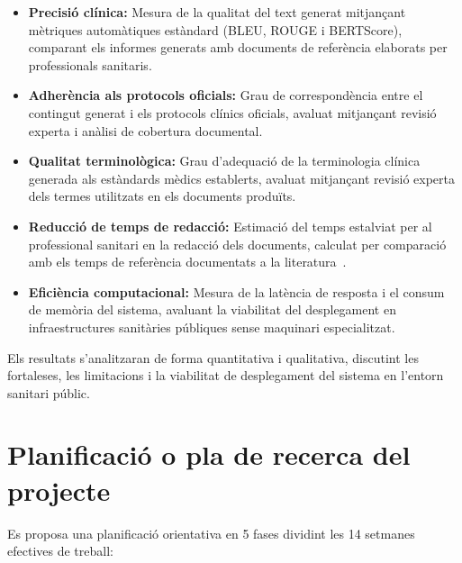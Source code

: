 \documentclass[11pt,a4paper]{article}
\begin{document}
\begin{itemize}
    \item \textbf{Precisió clínica:} Mesura de la qualitat del text generat mitjançant mètriques automàtiques estàndard (BLEU, ROUGE i BERTScore), comparant els informes generats amb documents de referència elaborats per professionals sanitaris.

    \item \textbf{Adherència als protocols oficials:} Grau de correspondència entre el contingut generat i els protocols clínics oficials, avaluat mitjançant revisió experta i anàlisi de cobertura documental.

    \item \textbf{Qualitat terminològica:} Grau d'adequació de la terminologia clínica generada als estàndards mèdics establerts, avaluat mitjançant revisió experta dels termes utilitzats en els documents produïts.

    \item \textbf{Reducció de temps de redacció:} Estimació del temps estalviat per al professional sanitari en la redacció dels documents, calculat per comparació amb els temps de referència documentats a la literatura~\cite{sinsky2016allocation}.
    
    \item \textbf{Eficiència computacional:} Mesura de la latència de resposta i el consum de memòria del sistema, avaluant la viabilitat del desplegament en infraestructures sanitàries públiques sense maquinari especialitzat.
\end{itemize}

Els resultats s'analitzaran de forma quantitativa i qualitativa, discutint les fortaleses, les limitacions i la viabilitat de desplegament del sistema en l'entorn sanitari públic.

\section*{Planificació o pla de recerca del projecte}
Es proposa una planificació orientativa en 5 fases dividint les 14 setmanes efectives de treball: 
\end{document}
